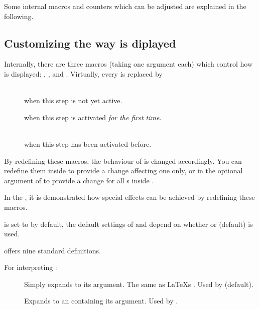   Some internal macros and counters which can be adjusted are explained in the following.

  \newslide

  \subsection{Customizing the way  is diplayed}\label{Sec:displaycustom}%
  Internally, there are three macros (taking one argument each) which control how  is displayed:
  , , and . Virtually, every
   is replaced by
  \begin{description}
  \item[]\mbox{}\\ when this step is not yet active.
  \item[] when this step is
    activated \emph{for the first time}.
  \item[]\mbox{}\\
    when this step has been activated before.
  \end{description}
  
  By redefining these macros, the behaviour of  is changed accordingly. You can redefine them inside
   to provide a change affecting one  only, or in the optional argument of
   to provide a change for all s inside .
  
  In the , it is demonstrated how special effects can be achieved by redefining these macros.

   is set to  by default, the default settings of
   and  depend on whether  or
   (default) is used.
  
  \newslide

   offers nine standard definitions.

  For interpreting :
  \begin{description}
  \item[] Simply expands to its argument. The same as \LaTeX s
    . Used by  (default).

  \item[] Expands to an  containing its argument. Used by
    .
  \end{description}

